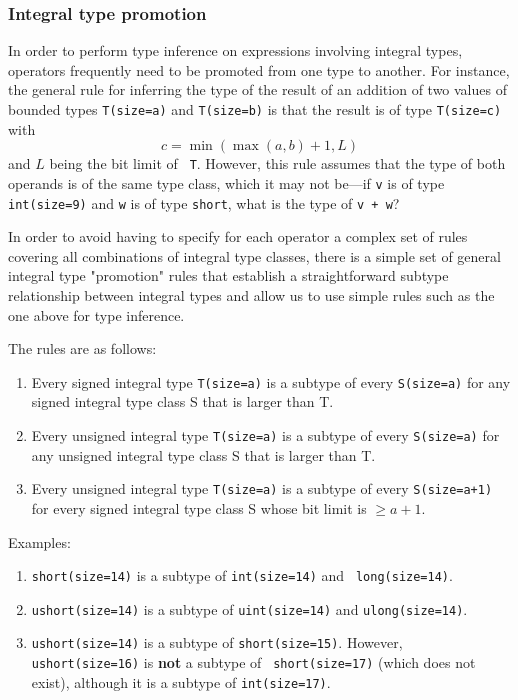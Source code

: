 \subsubsection{Integral type promotion}

In order to perform type inference on expressions involving integral
types, operators frequently need to be promoted from one type to
another. For instance, the general rule for inferring the type of the
result of an addition of two values of bounded types {\tt T(size=a)}
and {\tt T(size=b)} is that the result is of type {\tt T(size=c)} with
\[c = \min(\max(a, b) + 1, L)\] and $L$ being the bit limit of {\tt
  T}. However, this rule assumes that the type of both operands is of
the same type class, which it may not be---if {\tt v} is of type {\tt
  int(size=9)} and {\tt w} is of type {\tt short}, what is the type of
{\tt v + w}?

In order to avoid having to specify for each operator a complex set of
rules covering all combinations of integral type classes, there is a
simple set of general integral type "promotion" rules that establish a
straightforward subtype relationship between integral types and allow
us to use simple rules such as the one above for type inference.

The rules are as follows:
\begin{enumerate}
\item Every signed integral type {\tt T(size=a)} is a subtype of every
  {\tt S(size=a)} for any signed integral type class S that is larger
  than T.
\item Every unsigned integral type {\tt T(size=a)} is a subtype of every
  {\tt S(size=a)} for any unsigned integral type class S that is larger
  than T.
\item Every unsigned integral type {\tt T(size=a)} is a subtype of
  every {\tt S(size=a+1)} for every signed integral type class S whose
  bit limit is $\geq a+1$.
\end{enumerate}

Examples:
\begin{enumerate}
\item {\tt short(size=14)} is a subtype of {\tt int(size=14)} and {\tt
    long(size=14)}.
\item {\tt ushort(size=14)} is a subtype of {\tt uint(size=14)} and
  {\tt ulong(size=14)}.
\item {\tt ushort(size=14)} is a subtype of {\tt short(size=15)}.
  However, {\tt ushort(size=16)} is {\bf not} a subtype of {\tt
    short(size=17)} (which does not exist), although it is a subtype
  of {\tt int(size=17)}.
\end{enumerate}

